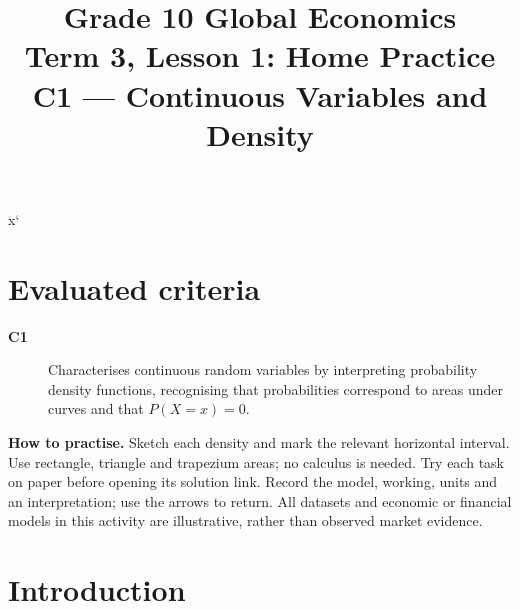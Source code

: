 x`\makeatletter
{}
\makeatother




\newcommand{\PracticeDensity}[9]{\begingroup\colorlet{blue}{black}\CompactDensityCoordinatesGraph{#1}{#2}{#3}{#4}{#5}{#6}{#7}{#8}{#9}\endgroup}

\title{Grade 10 Global Economics\\Term 3, Lesson 1: Home Practice\\C1 --- Continuous Variables and Density}
\author{}
\date{}

\maketitle
\setcounter{tocdepth}{1}
\setcounter{secnumdepth}{2}
\label{toc}
\tableofcontents
\section*{Evaluated criteria}
\begin{description}
\item[\textbf{C1}] Characterises continuous random variables by interpreting probability density functions, recognising that probabilities correspond to areas under curves and that \(P(X=x)=0\).
\end{description}
\textbf{How to practise.} Sketch each density and mark the relevant horizontal interval. Use rectangle, triangle and trapezium areas; no calculus is needed. Try each task on paper before opening its solution link. Record the model, working, units and an interpretation; use the arrows to return.
All datasets and economic or financial models in this activity are illustrative, rather than observed market evidence.

\clearpage
\section{Introduction}\label{sec:introduction}
